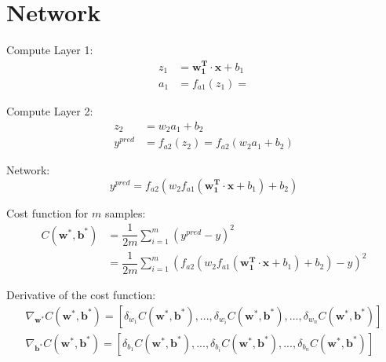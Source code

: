 \documentclass{article}
\begin{document}
\section*{Network}
\begin{center}
\end{center}

Compute Layer 1:
\begin{align}
  z_1 &= \mathbf{w_1^T} \cdot \mathbf{x} + b_1 \nonumber \\
  a_1 &= f_{a1}(z_1) = 
\end{align}

Compute Layer 2:
\begin{align}
  z_2 &= w_2 a_1 + b_2 \nonumber \\
  y^{pred} &= f_{a2}(z_2) = f_{a2}(w_2 a_1 + b_2)
\end{align}

Network:
\begin{equation}
  y^{pred} = f_{a2}(w_2 f_{a1}(\mathbf{w_1^T} \cdot \mathbf{x} + b_1) + b_2)
\end{equation}

Cost function for $m$ samples:
\begin{align}
  C(\mathbf{w^*},\mathbf{b^*}) &= \dfrac{1}{2m} \sum_{i=1}^m (y^{pred} - y)^2 \nonumber \\
  &= \dfrac{1}{2m} \sum_{i=1}^m (f_{a2}(w_2 f_{a1}(\mathbf{w_1^T} \cdot \mathbf{x} + b_1) + b_2) - y)^2
\end{align}

Derivative of the cost function:
\begin{align}
  \nabla_{\mathbf{w^*}}C(\mathbf{w^*}, \mathbf{b^*}) = [\delta_{w_1} C(\mathbf{w^*}, \mathbf{b^*}), ..., \delta_{w_i} C(\mathbf{w^*}, \mathbf{b^*}), ..., \delta_{w_n} C(\mathbf{w^*}, \mathbf{b^*})]  \\
  \nabla_{\mathbf{b^*}}C(\mathbf{w^*}, \mathbf{b^*}) = [\delta_{b_1} C(\mathbf{w^*}, \mathbf{b^*}), ..., \delta_{b_i} C(\mathbf{w^*}, \mathbf{b^*}), ..., \delta_{b_n} C(\mathbf{w^*}, \mathbf{b^*})]
\end{align}
\end{document}
